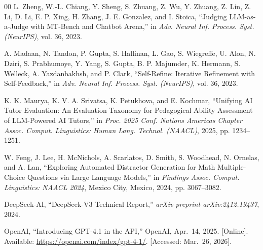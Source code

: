 \documentclass[conference]{IEEEtran}
\begin{document}
\begin{thebibliography}{00}
L. Zheng, W.-L. Chiang, Y. Sheng, S. Zhuang, Z. Wu, Y. Zhuang, Z. Lin, Z. Li, D. Li, E. P. Xing, H. Zhang, J. E. Gonzalez, and I. Stoica, ``Judging LLM-as-a-Judge with MT-Bench and Chatbot Arena,'' in \textit{Adv. Neural Inf. Process. Syst. (NeurIPS)}, vol. 36, 2023.

A. Madaan, N. Tandon, P. Gupta, S. Hallinan, L. Gao, S. Wiegreffe, U. Alon, N. Dziri, S. Prabhumoye, Y. Yang, S. Gupta, B. P. Majumder, K. Hermann, S. Welleck, A. Yazdanbakhsh, and P. Clark, ``Self-Refine: Iterative Refinement with Self-Feedback,'' in \textit{Adv. Neural Inf. Process. Syst. (NeurIPS)}, vol. 36, 2023.

K. K. Maurya, K. V. A. Srivatsa, K. Petukhova, and E. Kochmar, ``Unifying AI Tutor Evaluation: An Evaluation Taxonomy for Pedagogical Ability Assessment of LLM-Powered AI Tutors,'' in \textit{Proc. 2025 Conf. Nations Americas Chapter Assoc. Comput. Linguistics: Human Lang. Technol. (NAACL)}, 2025, pp. 1234--1251.

W. Feng, J. Lee, H. McNichols, A. Scarlatos, D. Smith, S. Woodhead, N. Ornelas, and A. Lan, ``Exploring Automated Distractor Generation for Math Multiple-Choice Questions via Large Language Models,'' in \textit{Findings Assoc. Comput. Linguistics: NAACL 2024}, Mexico City, Mexico, 2024, pp. 3067--3082.

DeepSeek-AI, ``DeepSeek-V3 Technical Report,'' \textit{arXiv preprint arXiv:2412.19437}, 2024.

OpenAI, ``Introducing GPT-4.1 in the API,'' OpenAI, Apr.~14, 2025. [Online]. Available: \url{https://openai.com/index/gpt-4-1/}. [Accessed: Mar.~26, 2026].

\end{thebibliography}
\end{document}
